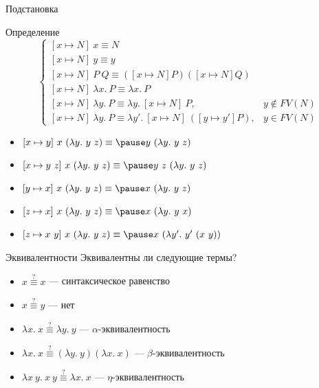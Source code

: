    \begin{frame}[fragile]{Подстановка}
        \begin{block}{Определение}
            \begin{equation}
                \nonumber
                \begin{cases}
                [x \mapsto N]
                    ~ x \equiv N \\
                    [x \mapsto N] ~ y \equiv y \\
                    [x \mapsto N] ~ P ~ Q \equiv ([x \mapsto N] P) ([x \mapsto N] Q) \\
                    [x \mapsto N] ~ \lambda x. ~ P \equiv \lambda x. ~ P \\
                    [x \mapsto N] ~ \lambda y. ~ P \equiv \lambda y. ~ [x \mapsto N] ~ P, & y \not\in FV(N) \\
                    [x \mapsto N] ~ \lambda y. ~ P \equiv \lambda y'. ~ [x \mapsto N] ~ ([y \mapsto y'] P), & y \in FV(N)
                \end{cases}
            \end{equation}
        \end{block}
        \begin{itemize}
            \item[\todo] $[x \mapsto y] ~ x ~ (\lambda y. ~ y ~ z) \equiv \pause y ~ (\lambda y. ~ y ~ z)$
            \item[\todo] $[x \mapsto y ~ z] ~ x ~ (\lambda y. ~ y ~ z) \equiv \pause y ~ z ~ (\lambda y. ~ y ~ z)$
            \item[\todo] $[y \mapsto x] ~ x ~ (\lambda y. ~ y ~ z) \equiv \pause x ~ (\lambda y. ~ y ~ z)$
            \item[\todo] $[z \mapsto x] ~ x ~ (\lambda y. ~ y ~ z) \equiv \pause x ~ (\lambda y. ~ y ~ x)$
            \item[\todo] $[z \mapsto x ~ y] ~ x ~ (\lambda y. ~ y ~ z) \equiv \pause x ~ (\lambda y'. ~ y' ~ (x ~ y))$
        \end{itemize}
    \end{frame}

    \begin{frame}[fragile]{Эквивалентности}
        Эквивалентны ли следующие термы?
        \begin{itemize}
            \item[\todo] $x \stackrel{?}{\equiv} x$ --- \pause синтаксическое равенство
            \item[\todo] $x \stackrel{?}{\equiv} y$ --- \pause нет
            \item[\todo] $\lambda x. ~ x \stackrel{?}{\equiv} \lambda y. ~ y$ --- \pause $\alpha$-эквивалентность
            \item[\todo] $\lambda x. ~ x \stackrel{?}{\equiv} (\lambda y. ~ y) (\lambda x. ~ x)$ --- \pause $\beta$-эквивалентность
            \item[\todo] $\lambda x ~ y. ~ x ~ y \stackrel{?}{\equiv} \lambda x. ~ x$ --- \pause $\eta$-эквивалентность
        \end{itemize}
    \end{frame}


